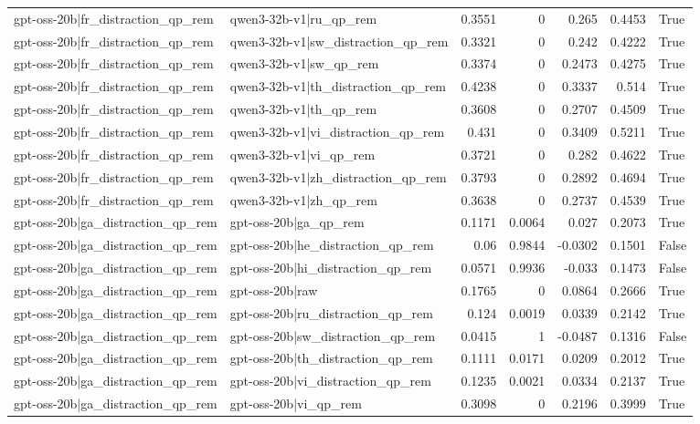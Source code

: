 \begin{table}
\begin{tabular}{l l r r r r l}
gpt-oss-20b|fr_distraction_qp_rem & qwen3-32b-v1|ru_qp_rem & 0.3551 & 0 & 0.265 & 0.4453 & True \\
gpt-oss-20b|fr_distraction_qp_rem & qwen3-32b-v1|sw_distraction_qp_rem & 0.3321 & 0 & 0.242 & 0.4222 & True \\
gpt-oss-20b|fr_distraction_qp_rem & qwen3-32b-v1|sw_qp_rem & 0.3374 & 0 & 0.2473 & 0.4275 & True \\
gpt-oss-20b|fr_distraction_qp_rem & qwen3-32b-v1|th_distraction_qp_rem & 0.4238 & 0 & 0.3337 & 0.514 & True \\
gpt-oss-20b|fr_distraction_qp_rem & qwen3-32b-v1|th_qp_rem & 0.3608 & 0 & 0.2707 & 0.4509 & True \\
gpt-oss-20b|fr_distraction_qp_rem & qwen3-32b-v1|vi_distraction_qp_rem & 0.431 & 0 & 0.3409 & 0.5211 & True \\
gpt-oss-20b|fr_distraction_qp_rem & qwen3-32b-v1|vi_qp_rem & 0.3721 & 0 & 0.282 & 0.4622 & True \\
gpt-oss-20b|fr_distraction_qp_rem & qwen3-32b-v1|zh_distraction_qp_rem & 0.3793 & 0 & 0.2892 & 0.4694 & True \\
gpt-oss-20b|fr_distraction_qp_rem & qwen3-32b-v1|zh_qp_rem & 0.3638 & 0 & 0.2737 & 0.4539 & True \\
gpt-oss-20b|ga_distraction_qp_rem & gpt-oss-20b|ga_qp_rem & 0.1171 & 0.0064 & 0.027 & 0.2073 & True \\
gpt-oss-20b|ga_distraction_qp_rem & gpt-oss-20b|he_distraction_qp_rem & 0.06 & 0.9844 & -0.0302 & 0.1501 & False \\
gpt-oss-20b|ga_distraction_qp_rem & gpt-oss-20b|hi_distraction_qp_rem & 0.0571 & 0.9936 & -0.033 & 0.1473 & False \\
gpt-oss-20b|ga_distraction_qp_rem & gpt-oss-20b|raw & 0.1765 & 0 & 0.0864 & 0.2666 & True \\
gpt-oss-20b|ga_distraction_qp_rem & gpt-oss-20b|ru_distraction_qp_rem & 0.124 & 0.0019 & 0.0339 & 0.2142 & True \\
gpt-oss-20b|ga_distraction_qp_rem & gpt-oss-20b|sw_distraction_qp_rem & 0.0415 & 1 & -0.0487 & 0.1316 & False \\
gpt-oss-20b|ga_distraction_qp_rem & gpt-oss-20b|th_distraction_qp_rem & 0.1111 & 0.0171 & 0.0209 & 0.2012 & True \\
gpt-oss-20b|ga_distraction_qp_rem & gpt-oss-20b|vi_distraction_qp_rem & 0.1235 & 0.0021 & 0.0334 & 0.2137 & True \\
gpt-oss-20b|ga_distraction_qp_rem & gpt-oss-20b|vi_qp_rem & 0.3098 & 0 & 0.2196 & 0.3999 & True \\

\end{tabular}
\end{table}

